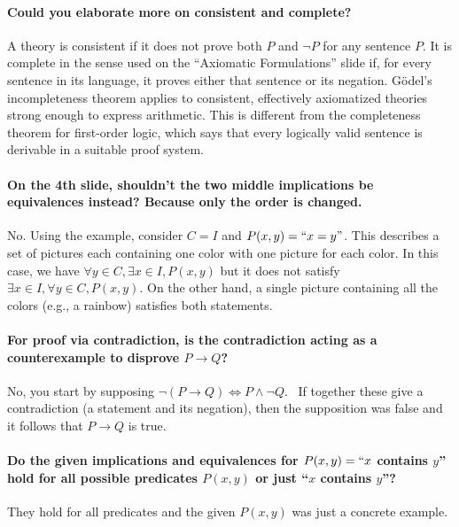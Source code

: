 \documentclass[10pt,english]{article}
\begin{document}
\paragraph{Could you elaborate more on consistent and complete?}


A theory is consistent if it does not prove both $P$ and $\neg P$ for any sentence $P$.
It is complete in the sense used on the ``Axiomatic Formulations'' slide if, for every sentence in its language, it proves either that sentence or its negation.
G\"odel's incompleteness theorem applies to consistent, effectively axiomatized theories strong enough to express arithmetic.
This is different from the completeness theorem for first-order logic, which says that every logically valid sentence is derivable in a suitable proof system.


\paragraph{On the 4th slide, shouldn't the two middle implications be equivalences instead? Because only the order is changed.}

No. Using the example, consider $C=I$ and $P(x,y) = ``x=y"$.  This describes a set of pictures each containing one color with one picture for each color.  In this case, we have $\forall y\in C, \exists x\in I, P(x,y)$ but it does not satisfy $\exists x\in I, \forall y\in C, P(x,y)$.  On the other hand, a single picture containing all the colors (e.g., a rainbow) satisfies both statements.


\paragraph{For proof via contradiction, is the contradiction acting as a counterexample to disprove $P \to Q$?}

No, you start by supposing $\neg(P \to Q) \Leftrightarrow P \wedge \neg Q$.  If together these give a contradiction (a statement and its negation), then the supposition was false and it follows that $P \to Q$ is true.

\paragraph{Do the given implications and equivalences for $P(x, y) = ``x$ contains $y$'' hold for all possible predicates $P(x, y)$ or just ``$x$ contains $y$''?}

They hold for all predicates and the given $P(x,y)$ was just a concrete example.
\end{document}
